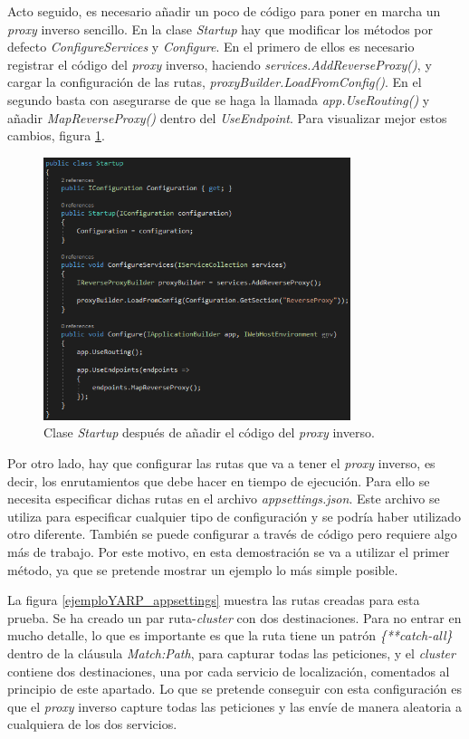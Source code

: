 \documentclass[11pt,spanish,listoffigures]{tfgetsinf}
\begin{document}
Acto seguido, es necesario añadir un poco de código para poner en marcha un \emph{proxy} inverso sencillo. En la clase \emph{Startup} hay que modificar los métodos por defecto \emph{ConfigureServices} y \emph{Configure}. En el primero de ellos es necesario registrar el código del \emph{proxy} inverso, haciendo \emph{services.AddReverseProxy()}, y cargar la configuración de las rutas, \emph{proxyBuilder.LoadFromConfig()}. En el segundo basta con asegurarse de que se haga la llamada \emph{app.UseRouting()} y añadir  \emph{MapReverseProxy()} dentro del \emph{UseEndpoint}. Para visualizar mejor estos cambios, figura \ref{ejemploYARP_startup}.

\begin{figure}[ht]
\centering
\includegraphics[width=0.8\textwidth]{imagenes/ejemploYARP/startup}
\caption{Clase \emph{Startup} después de añadir el código del \emph{proxy} inverso.}
	\label{ejemploYARP_startup}
\end{figure}

Por otro lado, hay que configurar las rutas que va a tener el \emph{proxy} inverso, es decir, los enrutamientos que debe hacer en tiempo de ejecución. Para ello se necesita especificar dichas rutas en el archivo \emph{appsettings.json}. Este archivo se utiliza para especificar cualquier tipo de configuración y se podría haber utilizado otro diferente. También se puede configurar a través de código pero requiere algo más de trabajo. Por este motivo, en esta demostración se va a utilizar el primer método, ya que se pretende mostrar un ejemplo lo más simple posible.

La figura \ref{ejemploYARP_appsettings} muestra las rutas creadas para esta prueba. Se ha creado un par ruta-\emph{cluster} con dos destinaciones. Para no entrar en mucho detalle, lo que es importante es que la ruta tiene un patrón \emph{\{**catch-all\}} dentro de la cláusula \emph{Match:Path}, para capturar todas las peticiones, y el \emph{cluster} contiene dos destinaciones, una por cada servicio de localización, comentados al principio de este apartado. Lo que se pretende conseguir con esta configuración es que el \emph{proxy} inverso capture todas las peticiones y las envíe de manera aleatoria a cualquiera de los dos servicios.
\end{document}
